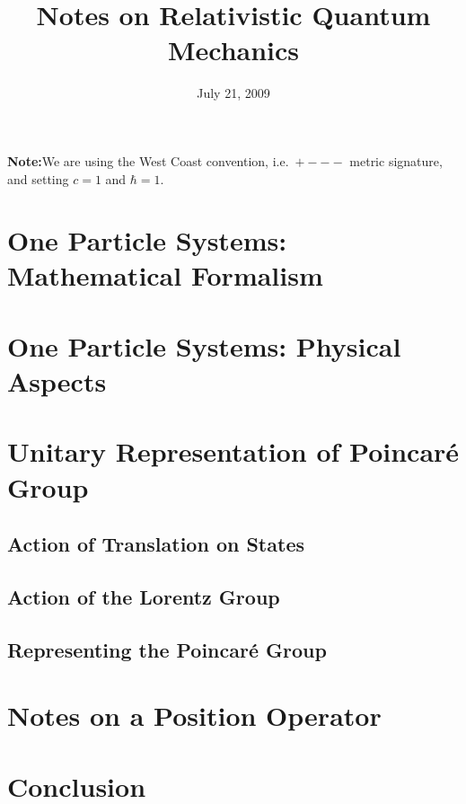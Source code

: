 \documentclass{article}
\title{Notes on Relativistic Quantum Mechanics}
\date{July 21, 2009}
\begin{document}
\maketitle
\textbf{Note:\quad}We are using the West Coast convention, i.e.\ $+---$ metric signature, and setting $c=1$ and $\hbar=1$.
\tableofcontents

\section{One Particle Systems: Mathematical Formalism}

\section{One Particle Systems: Physical Aspects}

\section{Unitary Representation of Poincar\'e Group}
\subsection{Action of Translation on States}

\subsection{Action of the Lorentz Group}

\subsection{Representing the Poincar\'e Group}


\section{Notes on a Position Operator}


\section{Conclusion}


\nocite{*}


\end{document}
